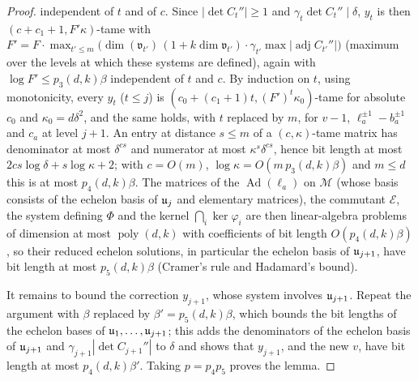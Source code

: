 \begin{proof}
independent of $t$ and of $c$. Since $|\det C_t''|\ge1$ and $\gamma_t\det C_t''\mid\delta$, $y_t$ is then
$(c+c_1+1,F'\kappa)$-tame with $F'=F\cdot\max_{t'\le m}\bigl(\dim(\mathfrak v_{t'})\,(1+k\dim\mathfrak v_{t'})\cdot\gamma_{t'}
\max|\operatorname{adj}C_{t'}''|\bigr)$ (maximum over the levels at which these systems are defined),
again with $\log F'\le p_3(d,k)\beta$ independent of $t$ and $c$. By
induction on $t$, using monotonicity, every $y_t$ ($t\le j$) is
$(c_0+(c_1+1)t,(F')^t\kappa_0)$-tame for absolute $c_0$ and $\kappa_0=d\delta^2$, and the same holds,
with $t$ replaced by $m$, for $v-1$, $\ell_a^{\pm1}-b_a^{\pm1}$ and $c_a$ at level $j+1$. An entry at
distance $s\le m$ of a $(c,\kappa)$-tame matrix has denominator at most $\delta^{cs}$ and numerator at
most $\kappa^s\delta^{cs}$, hence bit length at most $2cs\log\delta+s\log\kappa+2$; with $c=O(m)$,
$\log\kappa=O(m\,p_3(d,k)\beta)$ and $m\le d$ this is at most $p_4(d,k)\beta$. The matrices of the
$\operatorname{Ad}(\ell_a)$ on $\mathcal M$ (whose basis consists of the echelon basis of $\mathfrak{u}_j$ and elementary
matrices), the commutant $\mathcal E$, the system defining $\Phi$ and the kernel $\bigcap_i\ker\varphi_i$
are then linear-algebra problems of dimension at most $\operatorname{poly}(d,k)$ with coefficients of
bit length $O(p_4(d,k)\beta)$, so their reduced echelon solutions, in particular the echelon basis of
$\mathfrak{u}_{j+1}$, have bit length at most $p_5(d,k)\beta$ (Cramer's rule and Hadamard's bound).

It remains to bound the correction $y_{j+1}$, whose system involves $\mathfrak{u}_{j+1}$. Repeat the argument
with $\beta$ replaced by $\beta'=p_5(d,k)\beta$, which bounds the bit lengths of the echelon bases of
$\mathfrak{u}_1,\ldots,\mathfrak{u}_{j+1}$; this adds the denominators of the echelon basis of $\mathfrak{u}_{j+1}$ and
$\gamma_{j+1}|\det C_{j+1}''|$ to $\delta$ and shows that $y_{j+1}$, and the new $v$, have bit length at most
$p_4(d,k)\beta'$. Taking $p=p_4p_5$ proves the lemma.
\end{proof}


